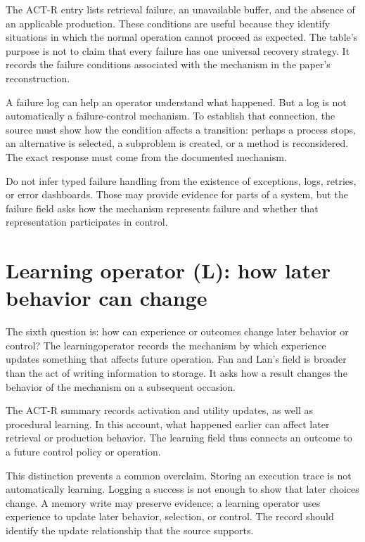 The ACT-R entry lists retrieval failure, an unavailable buffer, and the absence of an applicable production. These conditions are useful because they identify situations in which the normal operation cannot proceed as expected. The table's purpose is not to claim that every failure has one universal recovery strategy. It records the failure conditions associated with the mechanism in the paper's reconstruction.

A failure log can help an operator understand what happened. But a log is not automatically a failure-control mechanism. To establish that connection, the source must show how the condition affects a transition: perhaps a process stops, an alternative is selected, a subproblem is created, or a method is reconsidered. The exact response must come from the documented mechanism.

\begin{warningbox}
Do not infer typed failure handling from the existence of exceptions, logs, retries, or error dashboards. Those may provide evidence for parts of a system, but the failure field asks how the mechanism represents failure and whether that representation participates in control.
\end{warningbox}

\section{Learning operator (L): how later behavior can change}
\label{sec:field-learning}

The sixth question is: how can experience or outcomes change later behavior or control? The \gls{learningoperator} records the mechanism by which experience updates something that affects future operation. Fan and Lan's field is broader than the act of writing information to storage. It asks how a result changes the behavior of the mechanism on a subsequent occasion.

The ACT-R summary records activation and utility updates, as well as procedural learning. In this account, what happened earlier can affect later retrieval or production behavior. The learning field thus connects an outcome to a future control policy or operation.

This distinction prevents a common overclaim. Storing an execution trace is not automatically learning. Logging a success is not enough to show that later choices change. A memory write may preserve evidence; a learning operator uses experience to update later behavior, selection, or control. The record should identify the update relationship that the source supports.

